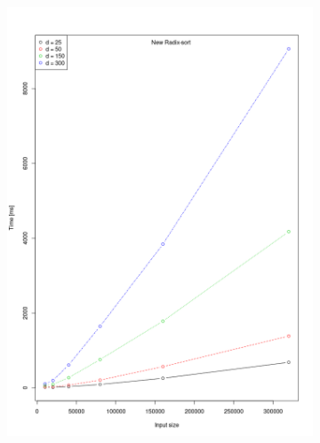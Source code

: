 \documentclass[a4paper]{scrartcl}
\begin{document}
\begin{figure}
\begin{subfigure}{.5\textwidth}
      \includegraphics[width=\linewidth]{resources/runtime_new_sort.png}
    \end{subfigure}
\end{figure}

\FloatBarrier
\end{document}

